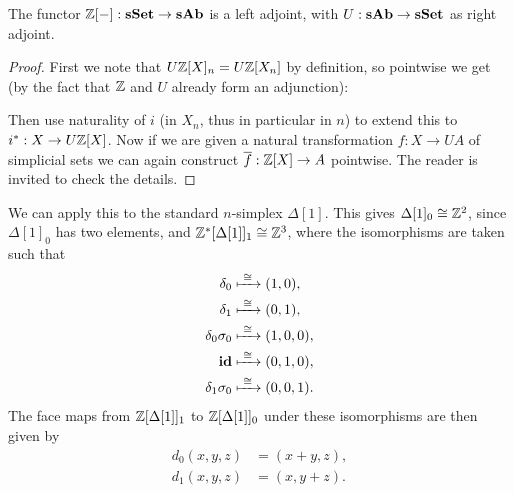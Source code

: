 \begin{lemma}
	The functor $\mathbb{Z}[-] : \mathbf{sSet} \to \mathbf{sAb}$ is a left adjoint, with $U: \mathbf{sAb} \to \mathbf{sSet}$ as right adjoint.
\end{lemma}
\begin{proof}
	First we note that $U\mathbb{Z}[X]_n = U\mathbb{Z}[X_n]$ by definition, so pointwise we get (by the fact that $\mathbb{Z}$ and $U$ already form an adjunction):
\begin{center}
\end{center}
	Then use naturality of $i$ (in $X_n$, thus in particular in $n$) to extend this to $i^\ast : X \to U\mathbb{Z}[X]$. Now if we are given a natural transformation $f: X \to UA$ of simplicial sets we can again construct $\overline{f}: \mathbb{Z}[X] \to A$ pointwise. The reader is invited to check the details.
\end{proof}

\begin{example}
	We can apply this to the standard $n$-simplex $\Delta[1]$. This gives $\Delta[1]_0 \cong \mathbb{Z}^2$, since $\Delta[1]_0$ has two elements, and $\mathbb{Z}^\ast[\Delta[1]]_1 \cong \mathbb{Z}^3$, where the isomorphisms are taken such that
	\begin{align*}
		\delta_0         &\xmapsto{\,\,{\cong}\,\,} (1, 0), \\
		\delta_1         &\xmapsto{\,\,{\cong}\,\,} (0, 1), \\
		\delta_0\sigma_0 &\xmapsto{\,\,{\cong}\,\,} (1, 0, 0), \\
		\mathbf{id}              &\xmapsto{\,\,{\cong}\,\,} (0, 1, 0), \\
		\delta_1\sigma_0 &\xmapsto{\,\,{\cong}\,\,} (0, 0, 1).
	\end{align*}
	The face maps from $\mathbb{Z}[\Delta[1]]_1$ to $\mathbb{Z}[\Delta[1]]_0$ under these isomorphisms are then given by
	\begin{align*}
		d_0(x, y, z) &= (x+y, z), \\
		d_1(x, y, z) &= (x, y+z).
	\end{align*}
\end{example}


